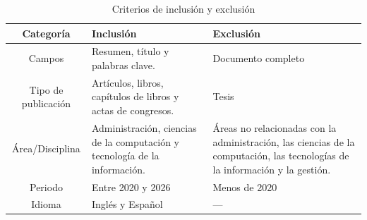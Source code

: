 \begin{table}[H]
	\centering
	\caption{Criterios de inclusión y exclusión}
	\label{tab:criterios-inclusion-exclusion}

	\renewcommand{\arraystretch}{1.2}
	\fontsize{9pt}{10pt}\selectfont

	\begin{tabularx}{\textwidth}{|c|X|X|}
		\hline
		\textbf{Categoría}                                                         &
		\textbf{Inclusión}                                                         &
		\textbf{Exclusión}
		\\
		\hline
		Campos                                                                     &
		Resumen, título y palabras clave.                                          &
		Documento completo
		\\
		\hline
		Tipo de publicación                                                        &
		Artículos, libros, capítulos de libros y actas de congresos.               &
		Tesis
		\\
		\hline
		Área/Disciplina                                                            &
		Administración, ciencias de la computación y tecnología de la información. &
		Áreas no relacionadas con la administración, las ciencias de la computación, las tecnologías de la información y la gestión.
		\\
		\hline
		Periodo                                                                    &
		Entre 2020 y 2026                                                          &
		Menos de 2020
		\\
		\hline
		Idioma                                                                     &
		Inglés y Español                                                           &
		---
		\\
		\hline
	\end{tabularx}
\end{table}
